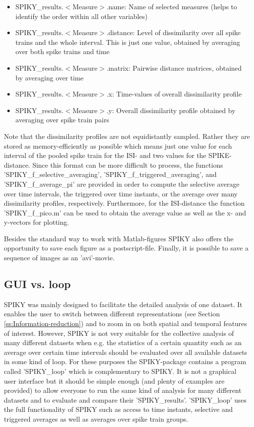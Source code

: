\documentclass[10pt,twocolumn]{elsart5p}
\begin{document}
\begin{itemize}
\item SPIKY\_results.$<$Measure$>$.name: Name of selected measures (helps to identify the order within all other variables)
\item SPIKY\_results.$<$Measure$>$.distance: Level of dissimilarity over all spike trains and the whole interval. This is just one value, obtained by averaging over both spike trains and time
\item SPIKY\_results.$<$Measure$>$.matrix: Pairwise distance matrices, obtained by averaging over time
\item SPIKY\_results.$<$Measure$>$.x: Time-values of overall dissimilarity profile
\item SPIKY\_results.$<$Measure$>$.y: Overall dissimilarity profile obtained by averaging over spike train pairs
\end{itemize}

Note that the dissimilarity profiles are not equidistantly sampled. Rather they are stored as memory-efficiently as possible which means just one value for each interval of the pooled spike train for the ISI- and two values for the SPIKE-distance. Since this format can be more difficult to process, the functions 'SPIKY\_f\_selective\_averaging', 'SPIKY\_f\_triggered\_averaging', and 'SPIKY\_f\_average\_pi' are provided in order to compute the selective average over time intervals, the triggered over time instants, or the average over many dissimilarity profiles, respectively. Furthermore, for the ISI-distance the function 'SPIKY\_f\_pico.m' can be used to obtain the average value as well as the x- and y-vectors for plotting.

Besides the standard way to work with Matlab-figures SPIKY also offers the opportunity to save each figure as a postscript-file. Finally, it is possible to save a sequence of images as an 'avi'-movie.


\subsection{\label{ss:GUI-vs-loop} GUI vs. loop}

SPIKY was mainly designed to facilitate the detailed analysis of one dataset. It enables the user to switch between different representations (see Section \ref{ss:Information-reduction}) and to zoom in on both spatial and temporal features of interest. However, SPIKY is not very suitable for the collective analysis of many different datasets when e.g. the statistics of a certain quantity such as an average over certain time intervals should be evaluated over all available datasets in some kind of loop. For these purposes the SPIKY-package contains a program called 'SPIKY\_loop' which is complementary to SPIKY. It is not a graphical user interface but it should be simple enough (and plenty of examples are provided) to allow everyone to run the same kind of analysis for many different datasets and to evaluate and compare their 'SPIKY\_results'. 'SPIKY\_loop' uses the full functionality of SPIKY such as access to time instants, selective and triggered averages as well as averages over spike train groups.
\end{document}
